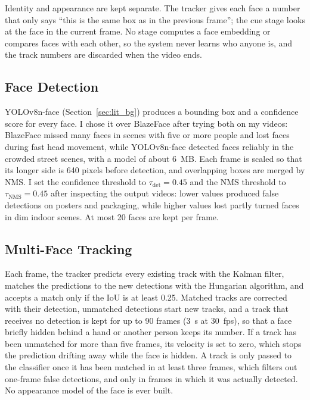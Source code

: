 Identity and appearance are kept separate. The tracker gives each face a number that only
says ``this is the same box as in the previous frame''; the cue stage looks at the face in
the current frame. No stage computes a face embedding or compares faces with each other,
so the system never learns who anyone is, and the track numbers are discarded when the
video ends.

\subsection{Face Detection}
\label{sec:detection}

YOLOv8n-face (Section~\ref{sec:lit_bg}) produces a bounding box and a confidence score for
every face. I chose it over BlazeFace after trying both on my videos: BlazeFace missed many
faces in scenes with five or more people and lost faces during fast head movement, while
YOLOv8n-face detected faces reliably in the crowded street scenes, with a model of about
6~MB. Each frame is scaled so that its longer side is 640 pixels before detection, and
overlapping boxes are merged by NMS. I set the confidence threshold to
$\tau_{\mathrm{det}} = 0.45$ and the NMS threshold to $\tau_{\mathrm{NMS}} = 0.45$ after
inspecting the output videos: lower values produced false detections on posters and
packaging, while higher values lost partly turned faces in dim indoor scenes. At most 20
faces are kept per frame.

\subsection{Multi-Face Tracking}
\label{sec:tracking}

Each frame, the tracker predicts every existing track with the Kalman filter, matches the
predictions to the new detections with the Hungarian algorithm, and accepts a match only if
the IoU is at least 0.25. Matched tracks are corrected with their detection, unmatched
detections start new tracks, and a track that receives no detection is kept for up to 90
frames (3~s at 30~fps), so that a face briefly hidden behind a hand or another person keeps
its number. If a track has been unmatched for more than five frames, its velocity is set to
zero, which stops the prediction drifting away while the face is hidden. A track is only
passed to the classifier once it has been matched in at least three frames, which filters
out one-frame false detections, and only in frames in which it was actually detected. No
appearance model of the face is ever built.

